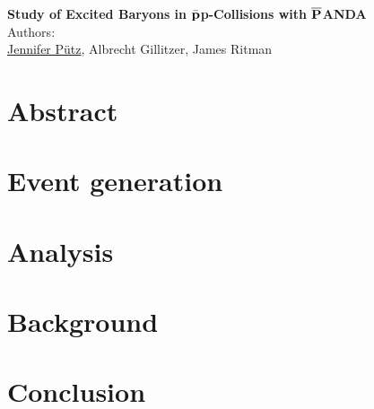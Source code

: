 \documentclass[a4paper, 11pt, twoside]{scrreprt}
\begin{document}
	\pagestyle{fancy}
	\begin{titlepage}
		\thispagestyle{empty}
		\begin{center}
			\textbf{\Huge{Study of Excited \cascade Baryons in $\bar{\textnormal{\textbf{p}}}$p-Collisions with $\overline{\textnormal{\textbf{P}}}$ANDA}}\vspace{1cm}\\
			\Large{Authors:}\vspace{0.3cm}\\
			\LARGE{\underline{Jennifer 
			      P\"{u}tz}, Albrecht Gillitzer, James Ritman\vspace{2cm}}
		\end{center}\vspace{1cm}

	\end{titlepage}
	\thispagestyle{empty}
	\chapter*{Abstract}
		
		\thispagestyle{empty}
	
	
	\setcounter{page}{0}
	\tableofcontents
	\newpage
	\setcounter{page}{1}

	
	\chapter{Event generation}
		
	
	\chapter{Analysis}
		
	
	\chapter{Background}
		
	
	\chapter{Conclusion}
		
	
\end{document}
